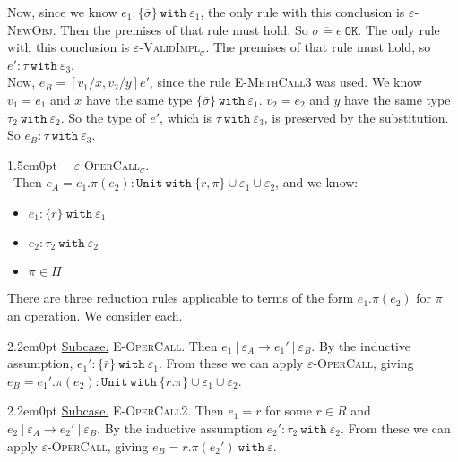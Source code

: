 \documentclass{llncs}
\newcommand{\keywadj}[1]{\mathtt{#1}}
\newcommand{\keyw}[1]{\keywadj{#1}~}
\newcommand{\proofcase}[2]{
	\begin{adjustwidth}{1.5em}{0pt}
		\fbox{Case.}~~#1. \\ ~#2
	\end{adjustwidth}
}
\newcommand{\subcase}[1] {
	\begin{adjustwidth}{2.2em}{0pt}
		\underline{Subcase.} #1
	\end{adjustwidth}
}
\begin{document}
{{{	\noindent	
Now, since we know $e_1  : \{ \overline \sigma \}~ \keyw{with} \varepsilon_1$, the only rule with this conclusion is \textsc{$\varepsilon$-NewObj}. Then the premises of that rule must hold. So $\overline{ \sigma = e }~\keywadj{OK}$. The only rule with this conclusion is \textsc{$\varepsilon$-ValidImpl$_{\sigma}$}. The premises of that rule must hold, so $e' : \tau~\keyw{with} \varepsilon_3$.
		\\ \noindent
			Now, $e_B = [v_1/x, v_2/y]e'$, since the rule \textsc{E-MethCall3} was used. We know $v_1 = e_1$ and $x$ have the same type $\{ \overline \sigma \}~ \keyw{with} \varepsilon_1$. $v_2 = e_2$ and $y$ have the same type $\tau_2~\keyw{with} \varepsilon_2$. So the type of $e'$, which is $\tau~\keyw{with} \varepsilon_3$, is preserved by the substitution. So $e_B : \tau~\keyw{with} \varepsilon_3$. \\ }
}


	\proofcase{\textsc{$\varepsilon$-OperCall$_{\sigma}$}} {Then $e_A = e_1.\pi(e_2) : \keyw{Unit~with} \{ r, \pi \} \cup \varepsilon_1 \cup \varepsilon_2$, and we know:
	\begin{itemize}
		\item $e_1 : \{ \bar r \}~\keyw{with} \varepsilon_1$
		\item $e_2 : \tau_2~\keyw{with} \varepsilon_2$
		\item $\pi \in \Pi$
	\end{itemize}
There are three reduction rules applicable to terms of the form $e_1.\pi(e_2)$ for $\pi$ an operation. We consider each.

	\subcase { \textsc{E-OperCall}. Then $e_1~|~\varepsilon_A \longrightarrow e_1'~|~\varepsilon_B$. By the inductive assumption, $e_1' : \{ \bar r \} ~ \keyw{with} \varepsilon_1$. From these we can apply \textsc{$\varepsilon$-OperCall}, giving $e_B = e_1'.\pi(e_2) : \keyw{Unit~with} \{ r.\pi \} \cup \varepsilon_1 \cup \varepsilon_2$.
	}
	
	\subcase{ \textsc{E-OperCall2}. Then $e_1 = r$ for some $r \in R$ and $e_2~|~\varepsilon_A \longrightarrow e_2'~|~\varepsilon_B$. By the inductive assumption $e_2' : \tau_2~\keyw{with} \varepsilon_2$. From these we can apply \textsc{$\varepsilon$-OperCall}, giving $e_B = r.\pi(e_2')~\keyw{with} \varepsilon$.
		}
	
}}
\end{document}
